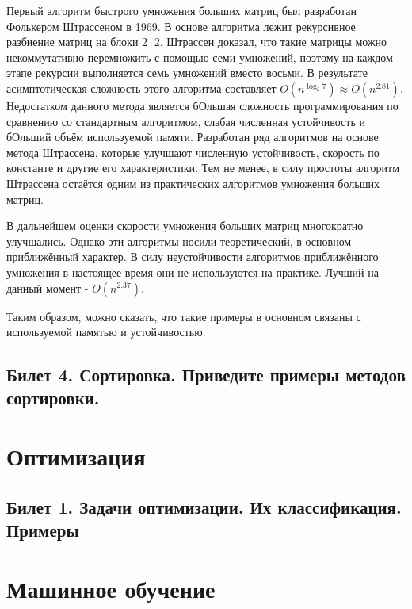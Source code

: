 \documentclass[a4paper, 12pt]{article}
\begin{document}
	Первый алгоритм быстрого умножения больших матриц был разработан Фолькером Штрассеном в 1969. В основе алгоритма лежит рекурсивное разбиение матриц на блоки $2 \cdot 2$. Штрассен доказал, что такие матрицы можно некоммутативно перемножить с помощью семи умножений, поэтому на каждом этапе рекурсии выполняется семь умножений вместо восьми. В результате асимптотическая сложность этого алгоритма составляет $O(n^{\log _{2}7})\approx O(n^{2.81})$. Недостатком данного метода является бОльшая сложность программирования по сравнению со стандартным алгоритмом, слабая численная устойчивость и бОльший объём используемой памяти. Разработан ряд алгоритмов на основе метода Штрассена, которые улучшают численную устойчивость, скорость по константе и другие его характеристики. Тем не менее, в силу простоты алгоритм Штрассена остаётся одним из практических алгоритмов умножения больших матриц.
	
	В дальнейшем оценки скорости умножения больших матриц многократно улучшались. Однако эти алгоритмы носили теоретический, в основном приближённый характер. В силу неустойчивости алгоритмов приближённого умножения в настоящее время они не используются на практике. Лучший на данный момент - $O(n^{2.37})$.
	
	Таким образом, можно сказать, что такие примеры в основном связаны с используемой памятью и устойчивостью.
	\subsection*{Билет 4.  Сортировка. Приведите примеры методов сортировки.}
	\section*{Оптимизация}
	\subsection*{Билет 1. Задачи оптимизации. Их классификация. Примеры}
	\section*{Машинное обучение}
\end{document}
